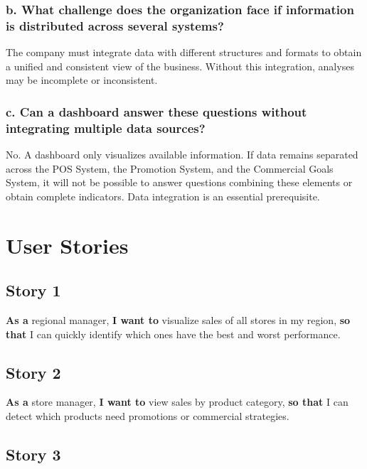 \documentclass[12pt,a4paper]{article}
\begin{document}
\subsubsection{b. What challenge does the organization face if information is distributed across several systems?}

The company must integrate data with different structures and formats to obtain a unified and consistent view of the business. Without this integration, analyses may be incomplete or inconsistent.

\subsubsection{c. Can a dashboard answer these questions without integrating multiple data sources?}

No. A dashboard only visualizes available information. If data remains separated across the POS System, the Promotion System, and the Commercial Goals System, it will not be possible to answer questions combining these elements or obtain complete indicators. Data integration is an essential prerequisite.


\section{User Stories}

\subsection{Story 1}

\textbf{As a} regional manager, \textbf{I want to} visualize sales of all stores in my region, \textbf{so that} I can quickly identify which ones have the best and worst performance.

\subsection{Story 2}

\textbf{As a} store manager, \textbf{I want to} view sales by product category, \textbf{so that} I can detect which products need promotions or commercial strategies.

\subsection{Story 3}
\end{document}

